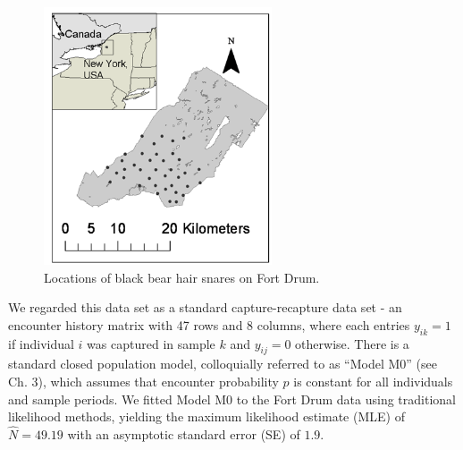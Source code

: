 \begin{figure}
\begin{center}
\includegraphics[height=3in]{Ch1/figs/hairsnares}
\end{center}
\caption{Locations of black bear hair snares on Fort Drum.}
\label{fig.hairsnares}
\end{figure}

We regarded this data set as a standard capture-recapture data set -
an encounter history matrix with 47 rows and 8 columns, where each
entries $y_{ik}=1$ if individual $i$ was captured in sample $k$ and
$y_{ij}=0$ otherwise. There is a standard closed population model,
colloquially referred to as ``Model M0'' (see Ch. 3), which assumes
that encounter probability $p$ is constant for all individuals and
sample periods.  We fitted Model M0 to the Fort Drum data using
traditional likelihood methods, yielding the maximum likelihood
estimate (MLE) of $\hat{N} = 49.19$ with an asymptotic standard error
(SE) of $1.9$.

